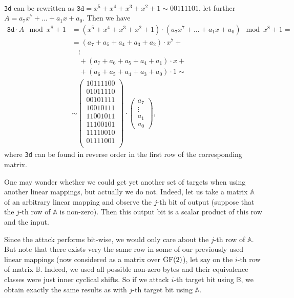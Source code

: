 \begin{example}
\label{ex:shiftmatrix}
	~ \\
	{\tt 3d} can be rewritten as $\texttt{3d} = x^5+x^4+x^3+x^2+1 \sim 00111101$, let further $A = a_7x^7+\ldots+a_1x+a_0$. Then we have
	\begin{align*}
		\texttt{3d} \cdot A \mod{x^8+1} &= (x^5+x^4+x^3+x^2+1) \cdot (a_7x^7+\ldots+a_1x+a_0) \mod{x^8+1} = \\
		&= (a_7+a_5+a_4+a_3+a_2)\cdot x^7 + ~\\
		&\quad\vdots \\
		&\quad + (a_7+a_6+a_5+a_4+a_1)\cdot x + ~\\
		&\quad + (a_6+a_5+a_4+a_3+a_0)\cdot 1 \sim \\
		&\sim
		\begin{pmatrix}
			\boxed{10111100} \\
			01011110 \\
			00101111 \\
			10010111 \\
			11001011 \\
			11100101 \\
			11110010 \\
			01111001 \\
		\end{pmatrix}
		\cdot
		\begin{pmatrix}
			a_7 \\ \vdots \\ a_1 \\ a_0
		\end{pmatrix} ,
	\end{align*}
	where {\tt 3d} can be found in reverse order in the first row of the corresponding matrix.
\end{example}

One may wonder whether we could get yet another set of targets when using another linear mappings, but actually we do not. Indeed, let us take a matrix $\mathbb{A}$ of an arbitrary linear mapping and observe the $j$-th bit of output (suppose that the $j$-th row of $\mathbb{A}$ is non-zero). Then this output bit is a scalar product of this row and the input.

Since the attack performs bit-wise, we would only care about the $j$-th row of $\mathbb{A}$. But note that there exists very the same row in some of our previously used linear mappings (now considered as a matrix over $\mathrm{GF}(2)$), let say on the $i$-th row of matrix $\mathbb{B}$. Indeed, we used all possible non-zero bytes and their equivalence classes were just inner cyclical shifts. So if we attack $i$-th target bit using $\mathbb{B}$, we obtain exactly the same results as with $j$-th target bit using $\mathbb{A}$.

